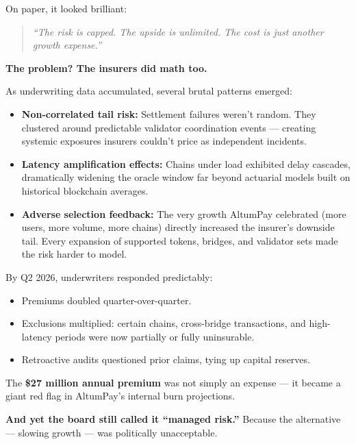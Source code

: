 On paper, it looked brilliant:

\begin{quote}
\textit{“The risk is capped. The upside is unlimited. The cost is just another growth expense.”}
\end{quote}

\bigskip

\textbf{The problem? The insurers did math too.}

As underwriting data accumulated, several brutal patterns emerged:

\begin{itemize}
    \item \textbf{Non-correlated tail risk:}  
    Settlement failures weren’t random. They clustered around predictable validator coordination events — creating systemic exposures insurers couldn't price as independent incidents.

    \item \textbf{Latency amplification effects:}  
    Chains under load exhibited delay cascades, dramatically widening the oracle window far beyond actuarial models built on historical blockchain averages.

    \item \textbf{Adverse selection feedback:}  
    The very growth AltumPay celebrated (more users, more volume, more chains) directly increased the insurer's downside tail. Every expansion of supported tokens, bridges, and validator sets made the risk harder to model.
\end{itemize}

\bigskip

By Q2 2026, underwriters responded predictably:

\begin{itemize}
    \item Premiums doubled quarter-over-quarter.
    \item Exclusions multiplied: certain chains, cross-bridge transactions, and high-latency periods were now partially or fully uninsurable.
    \item Retroactive audits questioned prior claims, tying up capital reserves.
\end{itemize}

The \textbf{\$27 million annual premium} was not simply an expense — it became a giant red flag in AltumPay's internal burn projections.

\bigskip

\textbf{And yet the board still called it “managed risk.”}  
Because the alternative --- slowing growth --- was politically unacceptable.

